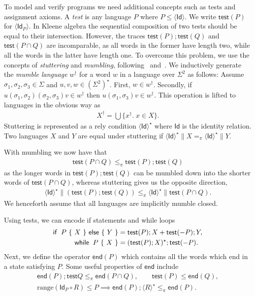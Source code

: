 \documentclass{llncs}
\newcommand{\test}{\mathsf{test}}
\newcommand{\Id}{\mathsf{Id}}
\newcommand{\edn}{\mathsf{end}}
\begin{document}
To model and verify programs we need additional concepts such as tests
and assignment axioms. A \emph{test} is any language $P$ where $P \le
\langle \Id\rangle$. We write $\test(P)$ for $\langle
\Id_P\rangle$. In Kleene algebra the sequential composition of two
tests should be equal to their intersection. However, the traces
$\test(P); \test(Q)$ and $\test(P \cap Q)$ are incomparable, as all
words in the former have length two, while all the words in the latter
have length one. To overcome this problem, we use the concepts of
\emph{stuttering} and \emph{mumbling},
following~\cite{brookes_full_1993}
and~\cite{dingel_refinement_2002}. We inductively generate the
\emph{mumble language} $w^\dagger$ for a word $w$ in a language over
$\Sigma^2$ as follows: Assume $\sigma_1,\sigma_2,\sigma_3 \in \Sigma$
and $u,v,w \in (\Sigma^2)^\star$. First, $w \in w^\dagger$. Secondly,
if $u(\sigma_1,\sigma_2)(\sigma_2,\sigma_3)v \in w^\dagger$ then
$u(\sigma_1,\sigma_3)v \in w^\dagger$. This operation is lifted to
languages in the obvious way as
\begin{align*}
X^\dagger = \bigcup\{x^\dagger.\; x \in X\}.
\end{align*}
Stuttering is represented as a rely condition $\langle \Id\rangle^\star$
where $\Id$ is the identity relation. Two languages $X$ and $Y$ are
equal under stuttering if $\langle \Id\rangle^\star \| X =_\pi \langle
\Id\rangle^\star \| Y$.

With mumbling we now have that
\begin{align*}
\test(P \cap Q) \le_\pi \test(P); \test(Q)
\end{align*}
as the longer words in $\test(P);\test(Q)$ can be mumbled down into
the shorter words of $\test(P\cap Q)$, whereas stuttering gives us the opposite direction,
\begin{align*}
\langle \Id\rangle^\star \| (\test(P);\test(Q)) \le_\pi \langle \Id\rangle^\star \| \test(P \cap Q).
\end{align*}
We henceforth assume that all languages are
implicitly mumble closed.

Using tests, we can encode if statements and while loops
\begin{align*}
\mathsf{if }\;\; P \text{ \{ } X \text { \} \textsf{else} \{ } Y \text{ \}} &= \test(P); X + \test(- P); Y,\\
\mathsf{while}\;\; P \text{ \{ } X \text{ \}} &= (\test(P);X)^\star;\test(- P).
\end{align*}
Next, we define the operator $\edn(P)$ which contains all the
words which end in a state satisfying $P$. Some useful properties of $\edn$ include
\begin{gather*}
\edn(P); \test{Q} \le_\pi \edn(P \cap Q), \qquad
\test(P) \le \edn(Q),\\
\text{range}(\Id_P \circ R) \le P \implies \edn(P); \langle R\rangle^\star \le_\pi \edn(P).
\end{gather*}
\end{document}
